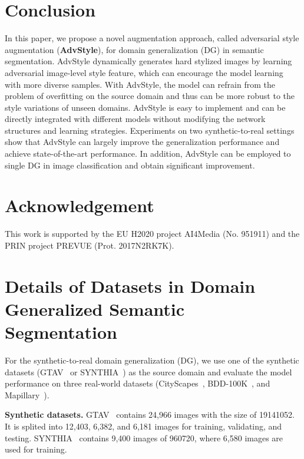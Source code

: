\documentclass{article}
\newcommand{\ours}{AdvStyle\xspace}
\begin{document}
\section{Conclusion}
\label{sec:conclusion}
In this paper, we propose a novel augmentation approach, called adversarial style augmentation (\textbf{\ours}), for domain generalization (DG) in semantic segmentation. \ours dynamically generates hard stylized images by learning adversarial image-level style feature, which can encourage the model learning with more diverse samples. With \ours, the model can refrain from the problem of overfitting on the source domain and thus can be more robust to the style variations of unseen domains. \ours is easy to implement and can be directly integrated with different models without modifying the network structures and learning strategies. Experiments on two synthetic-to-real settings show that \ours can largely improve the generalization performance and achieve state-of-the-art performance. In addition, \ours can be employed to single DG in image classification and obtain significant improvement. 

\section*{Acknowledgement}
This work is supported by the EU H2020 project AI4Media (No. 951911) and the PRIN project PREVUE  (Prot. 2017N2RK7K).



\newpage

\small



\appendix


\section{Details of Datasets in Domain Generalized Semantic Segmentation}
\label{sec:dataset-seg}
For the synthetic-to-real domain generalization (DG), we use one of the synthetic datasets (GTAV~\cite{gtav} or SYNTHIA~\cite{synthia}) as the source domain and evaluate the model performance on three real-world datasets (CityScapes~\cite{CityScapes}, BDD-100K~\cite{bdd}, and Mapillary~\cite{mapillary}). 

\textbf{Synthetic datasets.} 
GTAV~\cite{gtav} contains 24,966 images with the size of 19141052. It is splited into 12,403, 6,382, and 6,181 images for training, validating, and testing. SYNTHIA~\cite{synthia} contains 9,400 images of 960720, where 6,580 images are used for training.
\end{document}
